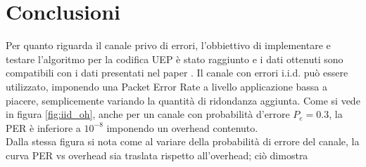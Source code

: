 \documentclass[italian, a4paper, 12pt]{article}
\begin{document}
\section{Conclusioni} %
Per quanto riguarda il canale privo di errori, l'obbiettivo di implementare e testare l'algoritmo per la codifica UEP è stato raggiunto e i dati ottenuti sono compatibili con i dati 
presentati nel paper \cite{uep}.
Il canale con errori i.i.d. può essere utilizzato, imponendo una
Packet Error Rate a livello applicazione bassa a piacere, semplicemente variando la quantità di ridondanza aggiunta.
Come si vede in figura \ref{fig:iid_oh}, anche per un canale con probabilità d'errore
 $P_e = 0.3$, la PER è inferiore a $10^{-8}$ imponendo un overhead contenuto.\\
Dalla stessa figura si nota come al variare della probabilità di 
errore del canale, la curva PER vs overhead sia traslata rispetto all'overhead; ciò dimostra
\end{document}
